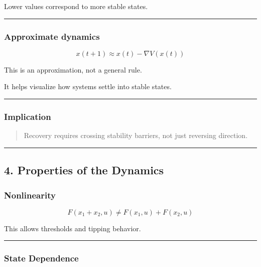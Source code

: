 \documentclass[
  letterpaper,
  DIV=11,
  numbers=noendperiod]{scrartcl}
\begin{document}
Lower values correspond to more stable states.

\begin{center}\rule{0.5\linewidth}{0.5pt}\end{center}

\subsubsection{Approximate dynamics}\label{approximate-dynamics}

\[
x(t+1) \approx x(t) - \nabla V(x(t))
\]

This is an approximation, not a general rule.

It helps visualize how systems settle into stable states.

\begin{center}\rule{0.5\linewidth}{0.5pt}\end{center}

\subsubsection{Implication}\label{implication-1}

\begin{quote}
Recovery requires crossing stability barriers, not just reversing
direction.
\end{quote}

\begin{center}\rule{0.5\linewidth}{0.5pt}\end{center}

\subsection{4. Properties of the
Dynamics}\label{properties-of-the-dynamics}

\subsubsection{Nonlinearity}\label{nonlinearity}

\[
F(x_1 + x_2, u) \neq F(x_1, u) + F(x_2, u)
\]

This allows thresholds and tipping behavior.

\begin{center}\rule{0.5\linewidth}{0.5pt}\end{center}

\subsubsection{State Dependence}\label{state-dependence}
\end{document}
